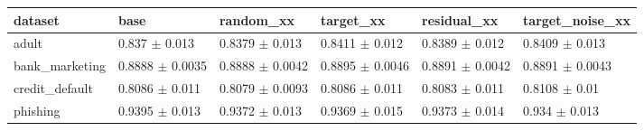 \begin{tabular}{llllll}
\toprule
dataset & base & random\_xx & target\_xx & residual\_xx & target\_noise\_xx \\
\midrule
adult & 0.837 $\pm$ 0.013 & 0.8379 $\pm$ 0.013 & 0.8411 $\pm$ 0.012 & 0.8389 $\pm$ 0.012 & 0.8409 $\pm$ 0.013 \\
bank\_marketing & 0.8888 $\pm$ 0.0035 & 0.8888 $\pm$ 0.0042 & 0.8895 $\pm$ 0.0046 & 0.8891 $\pm$ 0.0042 & 0.8891 $\pm$ 0.0043 \\
credit\_default & 0.8086 $\pm$ 0.011 & 0.8079 $\pm$ 0.0093 & 0.8086 $\pm$ 0.011 & 0.8083 $\pm$ 0.011 & 0.8108 $\pm$ 0.01 \\
phishing & 0.9395 $\pm$ 0.013 & 0.9372 $\pm$ 0.013 & 0.9369 $\pm$ 0.015 & 0.9373 $\pm$ 0.014 & 0.934 $\pm$ 0.013 \\
\bottomrule
\end{tabular}
